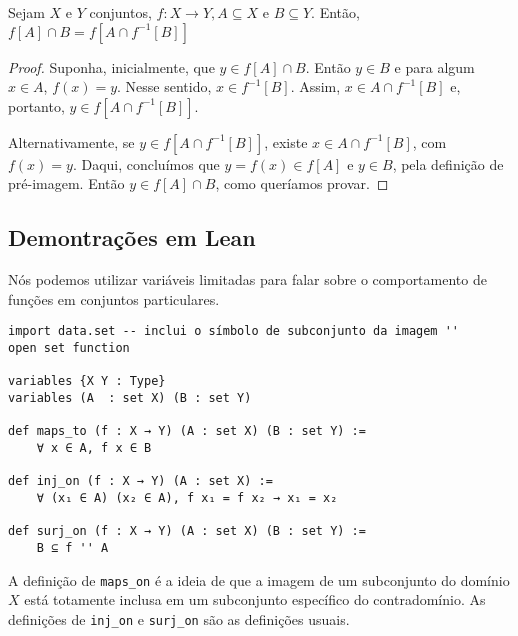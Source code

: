 \begin{theorem}[Item 11]
    \label{exerc2}
    Sejam $X$ e $Y$ conjuntos, $f: X \to Y, A \subseteq X$ e $B \subseteq Y$. Então,
    $f[A] \cap B = f[A \cap f^{-1}[B]]$
\end{theorem}

\begin{proof}
    Suponha, inicialmente, que $y \in f[A] \cap B$. Então $y \in B$ e para algum $x \in A$, $f(x) = y$.
    Nesse sentido, $x \in f^{-1}[B]$. Assim, $x \in A \cap f^{-1}[B]$ e, portanto, $y \in f[A \cap f^{-1}[B]]$.

    Alternativamente, se $y \in f[A \cap f^{-1}[B]]$, existe $x \in A \cap f^{-1}[B]$, com $f(x) = y$.
    Daqui, concluímos que $y = f(x) \in f[A]$ e $y \in B$, pela definição de pré-imagem. Então $y \in f[A] \cap B$,
    como queríamos provar.
\end{proof}

\subsection{Demontrações em Lean}

Nós podemos utilizar variáveis limitadas para falar sobre o comportamento de funções
em conjuntos particulares.

\begin{lstlisting}
import data.set -- inclui o símbolo de subconjunto da imagem ''
open set function

variables {X Y : Type}
variables (A  : set X) (B : set Y)

def maps_to (f : X → Y) (A : set X) (B : set Y) :=
    ∀ x ∈ A, f x ∈ B

def inj_on (f : X → Y) (A : set X) :=
    ∀ (x₁ ∈ A) (x₂ ∈ A), f x₁ = f x₂ → x₁ = x₂

def surj_on (f : X → Y) (A : set X) (B : set Y) :=
    B ⊆ f '' A

\end{lstlisting}

A definição de \lstinline{maps_on} é a ideia de que a imagem de um subconjunto do
domínio $X$ está totamente inclusa em um subconjunto específico do contradomínio. As
definições de \lstinline{inj_on} e \lstinline{surj_on} são as definições usuais.

\begin{theorem}[Item 3]
\end{theorem}

\begin{theorem}[Item 9]
\end{theorem}

